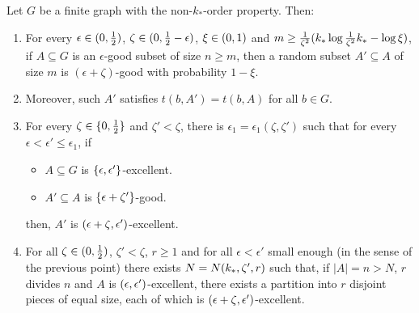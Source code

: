         \begin{lemma}[Claim 5.13] \label{lem:equitable_partition_of_excellent_parts}
            Let $G$ be a finite graph with the non-$k_{*}$-order property.
            Then:
            \begin{enumerate}[label=(\alph*), ref=\alph*]
                \item \label{itm:equitable_partition_of_excellent_parts.1} For every $\epsilon \in ( 0, \frac{1}{2} )$,
                    $\zeta \in ( 0, \frac{1}{2} - \epsilon )$, $\xi \in ( 0, 1 )$ and
                    $m \geq \frac{1}{\zeta^2}( k_* \log{\frac{1}{\zeta^2}k_*} - \log{\xi} )$,
                    if $A \subseteq G$ is an $\epsilon$-good subset of size $n \geq m$,
                    then a random subset $A' \subseteq A$ of size $m$ is $(\epsilon + \zeta)$-good with probability $1-\xi$.
                \item \label{itm:equitable_partition_of_excellent_parts.1*} Moreover, such $A'$ satisfies $t(b, A') = t(b, A)$ for all $b \in G$.
                \item \label{itm:equitable_partition_of_excellent_parts.2} For every $\zeta \in \{ 0, \frac{1}{2} \}$ and $\zeta' < \zeta$, there is
                    $\epsilon_1 = \epsilon_1(\zeta, \zeta')$ such that for every $\epsilon < \epsilon' \leq \epsilon_1$, if
                    \begin{itemize}
                        \item $A \subseteq G$ is $\{ \epsilon, \epsilon' \}$-excellent.
                        \item $A' \subseteq A$ is $\{ \epsilon + \zeta' \}$-good.
                    \end{itemize}
                    then, $A'$ is $( \epsilon + \zeta, \epsilon' )$-excellent.
                \item \label{itm:equitable_partition_of_excellent_parts.3} For all $\zeta \in ( 0, \frac{1}{2} )$, $\zeta' < \zeta$, $r \geq 1$ and for all
                    $\epsilon < \epsilon'$ small enough (in the sense of the previous point) there exists
                    $N = N( k_{*}, \zeta', r )$ such that, if $|A| = n > N$, $r$ divides $n$ and $A$ is
                    $( \epsilon, \epsilon' )$-excellent, there exists a partition into $r$ disjoint pieces of equal
                    size, each of which is $( \epsilon + \zeta, \epsilon' )$-excellent.
            \end{enumerate}

\end{lemma}
